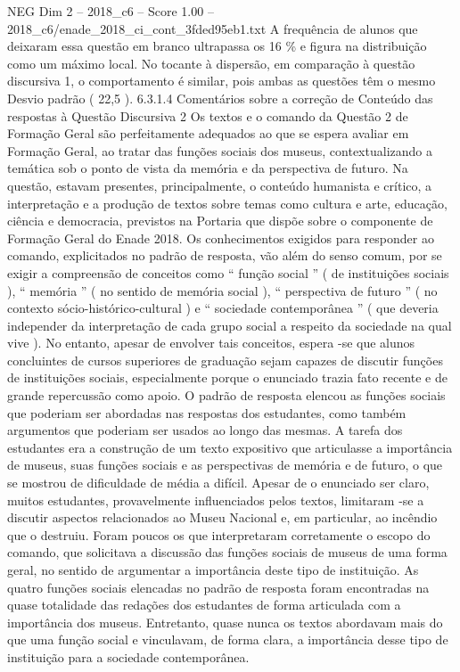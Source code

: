 \begin{textsample}{NEG Dim 2 – 2018\_c6 – Score 1.00 – 2018\_c6/enade\_2018\_ci\_cont\_3fded95eb1.txt}
A frequência de alunos que deixaram essa questão em branco ultrapassa os 16 \% e figura na distribuição como um máximo local.
No tocante à dispersão, em comparação à questão discursiva 1, o comportamento é similar, pois ambas as questões têm o mesmo Desvio padrão ( 22,5 ). 6.3.1.4 Comentários sobre a correção de Conteúdo das respostas à Questão Discursiva 2 Os textos e o comando da Questão 2 de Formação Geral são perfeitamente adequados ao que se espera avaliar em Formação Geral, ao tratar das funções sociais dos museus, contextualizando a temática sob o ponto de vista da memória e da perspectiva de futuro.
Na questão, estavam presentes, principalmente, o conteúdo humanista e crítico, a interpretação e a produção de textos sobre temas como cultura e arte, educação, ciência e democracia, previstos na Portaria que dispõe sobre o componente de Formação Geral do Enade 2018.
Os conhecimentos exigidos para responder ao comando, explicitados no padrão de resposta, vão além do senso comum, por se exigir a compreensão de conceitos como “ função social ” ( de instituições sociais ), “ memória ” ( no sentido de memória social ), “ perspectiva de futuro ” ( no contexto sócio-histórico-cultural ) e “ sociedade contemporânea ” ( que deveria independer da interpretação de cada grupo social a respeito da sociedade na qual vive ).
No entanto, apesar de envolver tais conceitos, espera -se que alunos concluintes de cursos superiores de graduação sejam capazes de discutir funções de instituições sociais, especialmente porque o enunciado trazia fato recente e de grande repercussão como apoio.
O padrão de resposta elencou as funções sociais que poderiam ser abordadas nas respostas dos estudantes, como também argumentos que poderiam ser usados ao longo das mesmas.
A tarefa dos estudantes era a construção de um texto expositivo que articulasse a importância de museus, suas funções sociais e as perspectivas de memória e de futuro, o que se mostrou de dificuldade de média a difícil.
Apesar de o enunciado ser claro, muitos estudantes, provavelmente influenciados pelos textos, limitaram -se a discutir aspectos relacionados ao Museu Nacional e, em particular, ao incêndio que o destruiu.
Foram poucos os que interpretaram corretamente o escopo do comando, que solicitava a discussão das funções sociais de museus de uma forma geral, no sentido de argumentar a importância deste tipo de instituição.
As quatro funções sociais elencadas no padrão de resposta foram encontradas na quase totalidade das redações dos estudantes de forma articulada com a importância dos museus.
Entretanto, quase nunca os textos abordavam mais do que uma função social e vinculavam, de forma clara, a importância desse tipo de instituição para a sociedade contemporânea.

\end{textsample}
